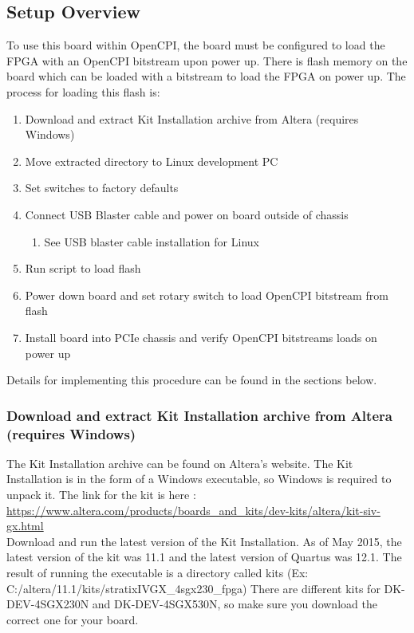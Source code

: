 \subsection*{Setup Overview}
 To use this board within OpenCPI, the board must be configured to load the FPGA with an OpenCPI bitstream upon power up. There is flash memory on the board which can be loaded with a bitstream to load the FPGA on power up. The process for loading this flash is:
\begin{enumerate}
\item Download and extract Kit Installation archive from Altera (requires Windows)
\item Move extracted directory to Linux development PC
\item Set switches to factory defaults
\item Connect USB Blaster cable and power on board outside of chassis
\begin{enumerate} \item See USB blaster cable installation for Linux \end{enumerate}
\item Run script to load flash
\item Power down board and set rotary switch to load OpenCPI bitstream from flash
\item Install board into PCIe chassis and verify OpenCPI bitstreams loads on power up
\end{enumerate}
 Details for implementing this procedure can be found in the sections below.
\subsubsection*{Download and extract Kit Installation archive from Altera (requires Windows)}
The Kit Installation archive can be found on Altera's website. The Kit Installation is in the form of a Windows executable, so Windows is required to unpack it. The link for the kit is here :\\\medskip
\url{​https://www.altera.com/products/boards_and_kits/dev-kits/altera/kit-siv-gx.html} \\\medskip
Download and run the latest version of the Kit Installation. As of May 2015, the latest version of the kit was 11.1 and the latest version of Quartus was 12.1. The result of running the executable is a directory called kits (Ex: C:/altera/11.1/kits/stratixIVGX\_4sgx230\_fpga) There are different kits for DK-DEV-4SGX230N and DK-DEV-4SGX530N, so make sure you download the correct one for your board.
